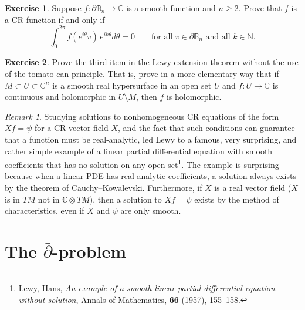 \documentclass[12pt,openany]{book}
\newcommand{\C}{{\mathbb{C}}}
\newcommand{\N}{{\mathbb{N}}}
\newcommand{\bB}{{\mathbb{B}}}
\theoremstyle{plain}
\theoremstyle{remark}
\newtheorem{remark}[thm]{Remark}
\theoremstyle{definition}
\newenvironment{exbox}{%
    \def\FrameCommand{\vrule width 1pt \relax\hspace{10pt}}%
    \MakeFramed{\advance\hsize-\width\FrameRestore}%
}{%
    \endMakeFramed
}
\theoremstyle{exercise}
\newtheorem{exercise}{Exercise}[section]
\theoremstyle{example}
\begin{document}
\begin{exbox}
\begin{exercise}
Suppose $f \colon \partial \bB_n \to \C$ is a smooth function and $n \geq 2$.
Prove that $f$ is a CR function if and only if
\begin{equation*}
\int_0^{2\pi} f(e^{i\theta}v) \, e^{ik\theta} d\theta = 0
\qquad
\text{for all $v \in \partial \bB_n$ and all $k \in \N$.}
\end{equation*}
\end{exercise}

\begin{exercise}
Prove the third item in the Lewy extension theorem without the use
of the tomato can principle.  That is, prove in a more elementary
way that if $M \subset U \subset \C^n$ is a smooth real hypersurface
in an open set $U$ and $f \colon U \to \C$ is continuous
and holomorphic in $U \setminus M$, then $f$ is holomorphic.
\end{exercise}
\end{exbox}

\begin{remark}
Studying solutions to nonhomogeneous CR equations of the form $X f = \psi$
for a CR vector field $X$,
and the fact that such conditions can guarantee
that a function must be real-analytic, led Lewy to a famous, very
surprising, and rather simple
example of a
linear partial differential equation with smooth coefficients
that has no solution on any open set\footnote{%
Lewy, Hans, \emph{An example of a smooth linear partial differential
equation without solution}, Annals of Mathematics, \textbf{66} (1957), 155--158.}.
The example is surprising because when a linear PDE has real-analytic
coefficients, a solution always exists by the theorem of Cauchy--Kowalevski.
Furthermore, if $X$ is a real vector field ($X$ is in $TM$ not in $\C
\otimes TM$),
then a solution to $Xf = \psi$ exists by the method of characteristics, even
if $X$ and $\psi$ are only smooth.
\end{remark}


\chapter{The \texorpdfstring{$\bar{\partial}$}{dbar}-problem} \label{ch:dbar}
\end{document}
